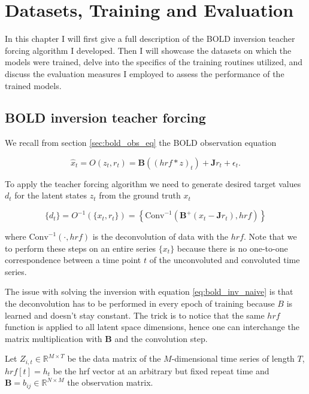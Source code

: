 \chapter{Datasets, Training and Evaluation} 

In this chapter I will first give a full description of the BOLD inversion teacher forcing algorithm I developed. 
Then I will showcase the datasets on which the models were trained, delve into the specifics of the training routines utilized, 
and discuss the evaluation measures I employed to assess the performance of the trained models.

\section{BOLD inversion teacher forcing}

We recall from section \ref{sec:bold_obs_eq} the BOLD observation equation

\begin{equation}
    \hat{x}_t = O(z_t, r_t) = \boldsymbol{B} \left( (hrf \ast z)_t\right) + \boldsymbol{J}r_t + \epsilon_t.
\end{equation}

To apply the teacher forcing algorithm we need to generate desired target values $d_t$ for the latent states $z_t$ from the ground truth $x_t$

\begin{equation}
    \{d_t\} = O^{-1}(\{x_t, r_t\}) = \left\{\text{Conv}^{-1}\left(\boldsymbol{B}^+ \left(x_t - \boldsymbol{J} r_t \right), hrf \right) \right\}
    \label{eq:bold_inv_naive}
\end{equation}

where $\text{Conv}^{-1}(\cdot, hrf)$ is the deconvolution of data with the $hrf$. Note that we to perform these steps on an entire series $\{x_t\}$
because there is no one-to-one correspondence between a time point $t$ of the unconvoluted and convoluted time series.

The issue with solving the inversion with equation \ref{eq:bold_inv_naive} is that the deconvolution has to be performed in every epoch of training because $B$ is 
learned and doesn't stay constant. The trick is to notice that the same $hrf$ function is applied to all latent space dimensions, hence one can interchange the matrix 
multiplication with $\boldsymbol{B}$ and the convolution step.

Let $Z_{i,t} \in \mathbb{R}^{M \times T}$ be the data matrix of the $M$-dimensional time series of length $T$, $hrf[t] = h_t$ be the hrf vector at an arbitrary
but fixed repeat time and $\boldsymbol{B} = b_{ij} \in \mathbb{R}^{N \times M}$ the observation matrix.

